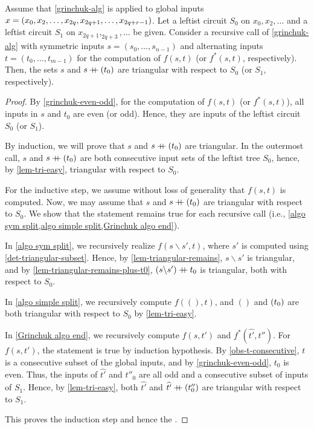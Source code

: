 \begin{lemma} \label{lem-s-tri}
  Assume that \cref{grinchuk-alg} is applied to global inputs $x = ({x_0, x_2, \dotsc, x_{2q}, x_{2q+1}, \dotsc, x_{2q + r - 1}})$.
  Let a leftist \AND{} circuit $S\!_0$ on $x_0, x_2, \dotsc$
  and a leftist \OR{} circuit $S\!_1$ on $x_{2q+1}, _{2q+3}, \dotsc$ be given.
  Consider a recursive call of \cref{grinchuk-alg} with symmetric inputs $s = (s_0, \dotsc, s_{n-1})$
  and alternating inputs $t = (t_0, \dotsc, t_{m-1})$
  for the computation of $f(s, t)$ (or $f^*(s, t)$, respectively).
  Then, the sets $s$ and $s \mathbin{+\mkern-8mu+} (t_0)$ are triangular with respect to $S\!_0$ (or $S\!_1$, respectively).
 \begin{proof}
  By \cref{grinchuk-even-odd},
  for the computation of $f(s, t)$ (or $f^*(s, t)$),
  all inputs in $s$ and $t_0$ are even (or odd).
  Hence, they are inputs of the leftist circuit $S\!_0$ (or $S\!_1$).

  By induction, we will prove
  that $s$ and $s \mathbin{+\mkern-8mu+} (t_0)$ are triangular.
  In the outermost call, $s$ and $s \mathbin{+\mkern-8mu+} (t_0)$ are both consecutive input sets of the leftist tree $S\!_0$,
  hence, by \cref{lem-tri-easy}, triangular with respect to $S\!_0$.

  For the inductive step, we assume without loss of generality that $f(s, t)$ is computed.
  Now, we may assume that $s$ and $s \mathbin{+\mkern-8mu+} (t_0)$ are triangular with respect to $S\!_0$.
  We show that the statement remains true for each recursive call
  (i.e., \cref{algo sym split,algo simple split,Grinchuk algo end}).

  In \cref{algo sym split}, we recursively realize $f(s \backslash s', t)$,
  where $s'$ is computed using \cref{det-triangular-subset}.
  Hence, by \cref{lem-triangular-remains}, $s \backslash s'$ is triangular,
  and by \cref{lem-triangular-remains-plus-t0}, $(s \backslash s') \mathbin{+\mkern-8mu+} t_0$
  is triangular, both with respect to $S\!_0$.

  In \cref{algo simple split}, we recursively compute $f((), t)$,
  and $()$ and $({t_0})$ are both triangular with respect to $S\!_0$
  by \cref{lem-tri-easy}.

  In \cref{Grinchuk algo end}, we recursively compute $f(s, t')$
  and $f^*(\widehat{t'}, t'')$.
  For $f(s, t')$, the statement is true by induction hypothesis.
  By \cref{obs-t-consecutive}, $t$ is a consecutive subset of the global inputs,
  and by \cref{grinchuk-even-odd}, $t_0$ is even.
  Thus, the inputs of $\widehat{t'}$ and $t''_0$ are all odd and a consecutive subset of inputs of $S\!_1$.
  Hence, by \cref{lem-tri-easy}, both $\widehat{t'}$ and $\widehat{t'} \mathbin{+\mkern-8mu+} (t''_0)$
  are triangular with respect to $S\!_1$.

  This proves the induction step and hence the .
\end{proof}
\end{lemma}

